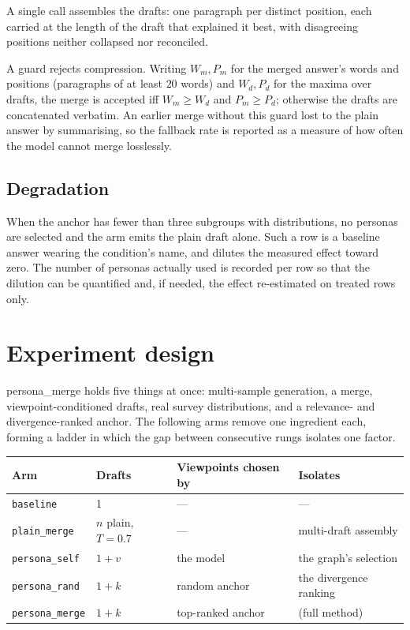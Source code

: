 \documentclass[11pt]{article}
\theoremstyle{definition}
\begin{document}
A single call assembles the drafts: one paragraph per distinct position, each
carried at the length of the draft that explained it best, with disagreeing
positions neither collapsed nor reconciled.

A guard rejects compression. Writing $W_m, P_m$ for the merged answer's words
and positions (paragraphs of at least $20$ words) and $W_d, P_d$ for the maxima
over drafts, the merge is accepted iff $W_m \ge W_d$ and $P_m \ge P_d$;
otherwise the drafts are concatenated verbatim. An earlier merge without this
guard lost to the plain answer by summarising, so the fallback rate is reported
as a measure of how often the model cannot merge losslessly.

\subsection{Degradation}
\label{sec:fallback}

When the anchor has fewer than three subgroups with distributions, no personas
are selected and the arm emits the plain draft alone. Such a row is a baseline
answer wearing the condition's name, and dilutes the measured effect toward
zero. The number of personas actually used is recorded per row so that the
dilution can be quantified and, if needed, the effect re-estimated on treated
rows only.

\section{Experiment design}
\label{sec:controls}

persona\_merge holds five things at once: multi-sample generation, a merge,
viewpoint-conditioned drafts, real survey distributions, and a relevance- and
divergence-ranked anchor. The following arms remove one ingredient each, forming
a ladder in which the gap between consecutive rungs isolates one factor.

\begin{table}[h]
\centering
\begin{tabular}{llll}
\toprule
Arm & Drafts & Viewpoints chosen by & Isolates \\
\midrule
\texttt{baseline}      & 1 & ---            & --- \\
\texttt{plain\_merge}   & $n$ plain, $T{=}0.7$ & --- & multi-draft assembly \\
\texttt{persona\_self}  & $1 + v$ & the model     & the graph's selection \\
\texttt{persona\_rand}  & $1 + k$ & random anchor & the divergence ranking \\
\texttt{persona\_merge} & $1 + k$ & top-ranked anchor & (full method) \\
\bottomrule
\end{tabular}
\end{table}
\end{document}
